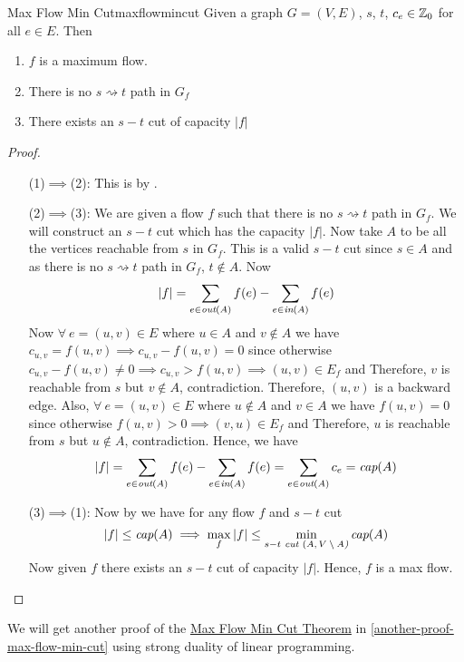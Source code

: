 \begin{Theorem}{Max Flow Min Cut}{maxflowmincut}
	Given a graph $G=(V,E)$, $s$, $t$, $c_e\in\mathbb{Z}_0$ for all $e\in E$. Then \tfae\begin{enumerate}[label=(\arabic*)]
		\item $f$ is a maximum flow.
		\item There is no $s\rightsquigarrow t$ path in $G_f$
		\item There exists an $s-t$ cut of capacity $|f|$
	\end{enumerate}
\end{Theorem}
\begin{proof}
	\begin{itemize}[leftmargin=2cm]
		\item[(1)$\implies$(2):] This is by .
		\item[(2)$\implies$(3):] We are given a flow $f$ such that there is no $s\rightsquigarrow t$ path in $G_f$. We will construct an $s-t$ cut which has the capacity $|f|$. Now take $A$ to be all the vertices reachable from $s$ in $G_f$. This is a valid $s-t$ cut since $s\in A$ and as there is no $s\rightsquigarrow t$ path in $G_f$, $t\notin A$. Now $$|f|=\sum_{e\in \emph{out$(A)$}}f(e)-\sum_{e\in\emph{in$(A)$}}f(e)$$Now $\forall\ e=(u,v)\in E$ where $u\in A$ and $v\notin A$ we have  $c_{u,v}=f(u,v)\implies c_{u,v}-f(u,v)=0$ since otherwise $c_{u,v}-f(u,v)\neq 0\implies c_{u,v}>f(u,v)\implies (u,v)\in E_f$ and Therefore, $v$ is reachable from $s$ but $v\notin A$, contradiction. Therefore, $(u,v)$ is a backward edge. Also, $\forall\ e=(u,v)\in E$ where $u\notin A$ and $v\in A$ we have $f(u,v)=0$ since otherwise   $f(u,v)>0\implies (v,u)\in E_f$ and Therefore, $u$ is reachable from $s$ but $u\notin A$, contradiction. Hence, we have $$|f|=\sum_{e\in \emph{out$(A)$}}f(e)-\sum_{e\in\emph{in$(A)$}}f(e)=\sum_{e\in \emph{out$(A)$}}c_e=\emph{cap}(A)$$
		\item[(3)$\implies$(1):] Now by  we have for any flow $f$ and $s-t$ cut $$|f|\leq \emph{cap$(A)$}\implies \max\limits_f|f|\leq\min\limits_{s-t\emph{ cut $(A,V\setminus A$)}}\emph{cap$(A)$}$$Now given $f$ there exists an $s-t$ cut of capacity $|f|$. Hence, $f$ is a max flow.
	\end{itemize}
\end{proof}We will get another proof of the \hyperref[maxflowmincut]{Max Flow Min Cut Theorem} in \autoref{another-proof-max-flow-min-cut} using strong duality of linear programming.

